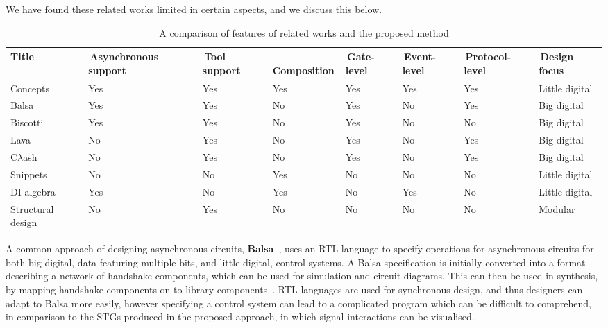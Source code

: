 \documentclass[british, journal]{IEEEtran}
\begin{document}
We have found these related works limited in certain aspects, and we discuss
this below.

\begin{table}[t]
\caption{A comparison of features of related works and the proposed method
\label{tab:related_work}}
  \centering
\begin{tabular}[htb]{| m{2.6cm} | m{2.0cm} | m{1.3cm} | m{1.75cm} | m{1.5cm} |
m{1.5cm} | m{1.7cm} | m{1.9cm} |}
  \hline
Title & \,Asynchronous support & \,Tool support & \,Composition & \,Gate-level &
\,Event-level & \,Protocol-level & \,Design focus \\ \hline \hline
Concepts & Yes & Yes & Yes & Yes & Yes & Yes & Little digital \\ \hline
Balsa & Yes & Yes & No & Yes & No & Yes & Big digital \\ \hline
Biscotti & Yes & Yes & No & Yes & No & No & Big digital \\ \hline
Lava & No & Yes & No & Yes & No & Yes & Big digital \\ \hline
C$\lambda$ash & No & Yes & No & Yes & No & Yes & Big digital \\ \hline
Snippets & No & No & Yes & No & No & No & Little digital \\ \hline
DI algebra & Yes & No & Yes & No & Yes & No & Little digital \\ \hline
Structural design & No & Yes & No & No & No & No & Modular \\ \hline
  \end{tabular}
  \vspace{-3mm}
\end{table}

A common approach of designing asynchronous circuits,
\textbf{Balsa}~\cite{edwards2002balsa}, uses an RTL language to specify
operations for asynchronous circuits for both big-digital, data featuring
multiple bits, and little-digital, control systems. A Balsa specification is
initially converted into a format describing a network of handshake components,
which can be used for simulation and circuit diagrams. This can then be used in
synthesis, by mapping handshake components on to library
components~\cite{van1993handshake}. RTL languages
are used for synchronous design, and thus designers can adapt to Balsa
more easily, however specifying a control system can lead to a complicated
program which can be difficult to
comprehend, in comparison to the STGs produced in the proposed approach,
in which signal interactions can be visualised.
\end{document}
